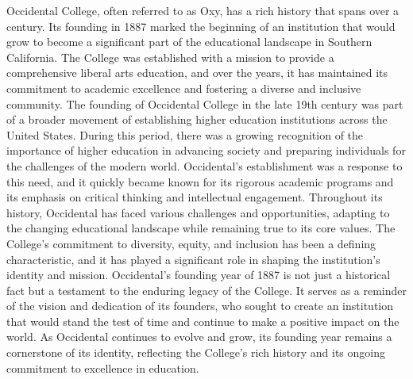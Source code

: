 \documentclass[10pt,twocolumn]{article}
\begin{document}
\begin{itemize}
Occidental College, often referred to as Oxy, has a rich history that spans over a century. Its founding in 1887 marked the beginning of an institution that would grow to become a significant part of the educational landscape in Southern California. The College was established with a mission to provide a comprehensive liberal arts education, and over the years, it has maintained its commitment to academic excellence and fostering a diverse and inclusive community. The founding of Occidental College in the late 19th century was part of a broader movement of establishing higher education institutions across the United States. During this period, there was a growing recognition of the importance of higher education in advancing society and preparing individuals for the challenges of the modern world. Occidental's establishment was a response to this need, and it quickly became known for its rigorous academic programs and its emphasis on critical thinking and intellectual engagement. Throughout its history, Occidental has faced various challenges and opportunities, adapting to the changing educational landscape while remaining true to its core values. The College's commitment to diversity, equity, and inclusion has been a defining characteristic, and it has played a significant role in shaping the institution's identity and mission. Occidental's founding year of 1887 is not just a historical fact but a testament to the enduring legacy of the College. It serves as a reminder of the vision and dedication of its founders, who sought to create an institution that would stand the test of time and continue to make a positive impact on the world. As Occidental continues to evolve and grow, its founding year remains a cornerstone of its identity, reflecting the College's rich history and its ongoing commitment to excellence in education.
\end{itemize}
\end{document}
